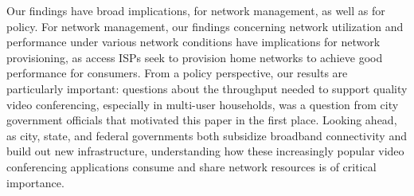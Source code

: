 Our findings have broad implications, for network management, as well as for
policy. For network management, our findings concerning network utilization
and performance under various network conditions have implications for network
provisioning, as access ISPs seek to provision home networks to achieve good
performance for consumers. From a policy perspective, our results are
particularly important: questions about the throughput needed to support
quality video conferencing, especially in multi-user households, was a
question from city government officials that motivated this paper in the first
place. Looking ahead, as city, state, and federal governments both subsidize
broadband connectivity and build out new infrastructure, understanding how
these increasingly popular video conferencing applications consume and share
network resources is of critical importance.



